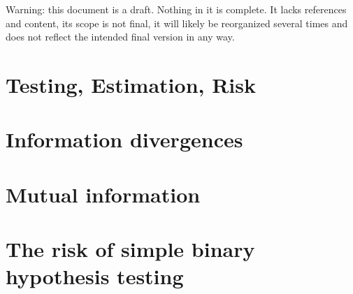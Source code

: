 %

Warning: this document is a draft. Nothing in it is complete. It lacks references and content, its scope is not final, it will likely be reorganized several times and does not reflect the intended final version in any way.



\chapter{Testing, Estimation, Risk}




\chapter{Information divergences}















\chapter{Mutual information}



\chapter{The risk of simple binary hypothesis testing}







\appendix




